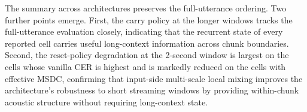 The summary across architectures preserves the full-utterance
ordering. Two further points emerge. First, the carry policy at
the longer windows tracks the full-utterance evaluation closely,
indicating that the recurrent state of every reported cell carries
useful long-context information across chunk boundaries. Second,
the reset-policy degradation at the 2-second window is largest on
the cells whose vanilla CER is highest and is markedly reduced on
the cells with effective MSDC, confirming that input-side
multi-scale local mixing improves the architecture's robustness to
short streaming windows by providing within-chunk acoustic
structure without requiring long-context state.
